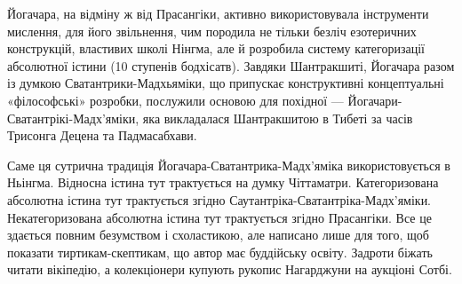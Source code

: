 Йогачара, на відміну ж від Прасангіки, активно використовувала інструменти мислення,
для його звільнення, чим породила не тільки безліч езотеричних конструкцій,
властивих школі Нінгма, але й розробила систему категоризації абсолютної істини (10 ступенів бодхісатв).
Завдяки Шантракшиті, Йогачара разом із думкою Сватантрики-Мадхьяміки, що припускає
конструктивні концептуальні «філософські» розробки, послужили основою
для похідної --- Йогачари-Сватантрікі-Мадх'яміки, яка викладалася Шантракшитою в Тибеті за часів Трисонга Децена та Падмасабхави.

Саме ця сутрична традиція Йогачара-Сватантрика-Мадх'яміка використовується в Ньінгма.
Відносна істина тут трактується на думку Чіттаматри. Категоризована абсолютна
істина тут трактується згідно Саутантріка-Сватантріка-Мадх'яміки. Некатегоризована
абсолютна істина тут трактується згідно Прасангіки. Все це здається повним
безумством і схоластикою, але написано лише для того, щоб показати
тиртикам-скептикам, що автор має буддійську освіту. Задроти біжать
читати вікіпедію, а колекціонери купують рукопис Нагарджуни на аукціоні Сотбі.